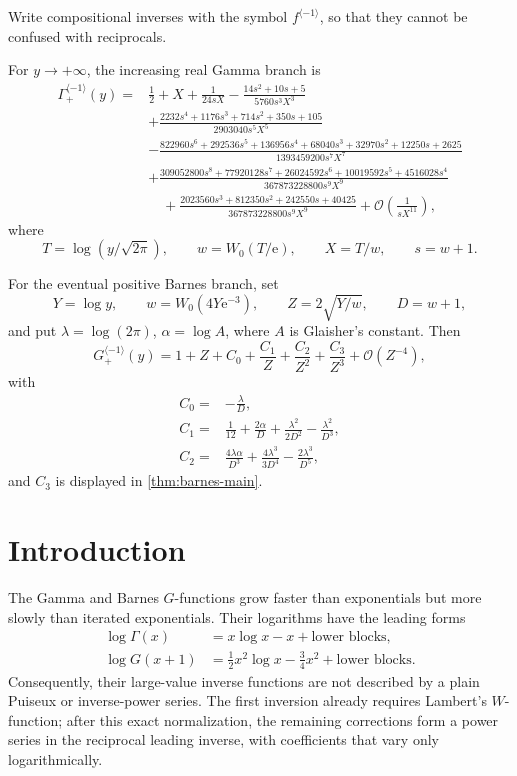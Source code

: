 \documentclass[11pt,a4paper]{article}
\numberwithin{equation}{section}
\theoremstyle{definition}
\theoremstyle{remark}
\newcommand{\e}{\mathrm e}
\newcommand{\Ord}{\mathcal O}
\newcommand{\cinv}{\langle-1\rangle}
\newcommand{\GamInv}{\Gamma_{+}^{\cinv}}
\newcommand{\BarnesInv}{G_{+}^{\cinv}}
\begin{document}
\begin{mainresultbox}
Write compositional inverses with the symbol \(f^{\cinv}\), so that they
cannot be confused with reciprocals.

For \(y\to+\infty\), the increasing real Gamma branch is
\begin{align*}
 \GamInv(y)={}&\frac12+X+\frac{1}{24sX}
 -\frac{14s^2+10s+5}{5760s^3X^3}\\
 &+\frac{2232s^4+1176s^3+714s^2+350s+105}
 {2903040s^5X^5}\\
 &-\frac{822960s^6+292536s^5+136956s^4+68040s^3
 +32970s^2+12250s+2625}
 {1393459200s^7X^7}\\
 &+\frac{309052800s^8+77920128s^7+26024592s^6+10019592s^5
 +4516028s^4}{367873228800s^9X^9}\\
 &\quad+\frac{2023560s^3+812350s^2+242550s+40425}
 {367873228800s^9X^9}
 +\Ord\!\left(\frac{1}{sX^{11}}\right),
\end{align*}
where
\[
 T=\log(y/\sqrt{2\pi}),\qquad w=W_0(T/\e),\qquad X=T/w,
 \qquad s=w+1.
\]

For the eventual positive Barnes branch, set
\[
 Y=\log y,\qquad w=W_0(4Y\e^{-3}),\qquad
 Z=2\sqrt{Y/w},\qquad D=w+1,
\]
and put \(\lambda=\log(2\pi)\), \(\alpha=\log A\), where \(A\) is
Glaisher's constant.  Then
\[
 \BarnesInv(y)=1+Z+C_0+\frac{C_1}{Z}+\frac{C_2}{Z^2}
 +\frac{C_3}{Z^3}+\Ord(Z^{-4}),
\]
with
\begin{align*}
 C_0={}&-\frac{\lambda}{D},\\
 C_1={}&\frac1{12}+\frac{2\alpha}{D}
 +\frac{\lambda^2}{2D^2}-\frac{\lambda^2}{D^3},\\
 C_2={}&\frac{4\lambda\alpha}{D^3}
 +\frac{4\lambda^3}{3D^4}-\frac{2\lambda^3}{D^5},
\end{align*}
and \(C_3\) is displayed in \cref{thm:barnes-main}.
\end{mainresultbox}

\tableofcontents
\newpage

\section{Introduction}

The Gamma and Barnes \(G\)-functions grow faster than exponentials but more
slowly than iterated exponentials.  Their logarithms have the leading
forms
\begin{align}
 \log\Gamma(x)&=x\log x-x+\text{lower blocks},\label{eq:intro-gamma}\\
 \log G(x+1)&=\frac12x^2\log x-\frac34x^2+\text{lower blocks}.
 \label{eq:intro-barnes}
\end{align}
Consequently, their large-value inverse functions are not described by a
plain Puiseux or inverse-power series.  The first inversion already
requires Lambert's \(W\)-function; after this exact normalization, the
remaining corrections form a power series in the reciprocal leading
inverse, with coefficients that vary only logarithmically.
\end{document}
